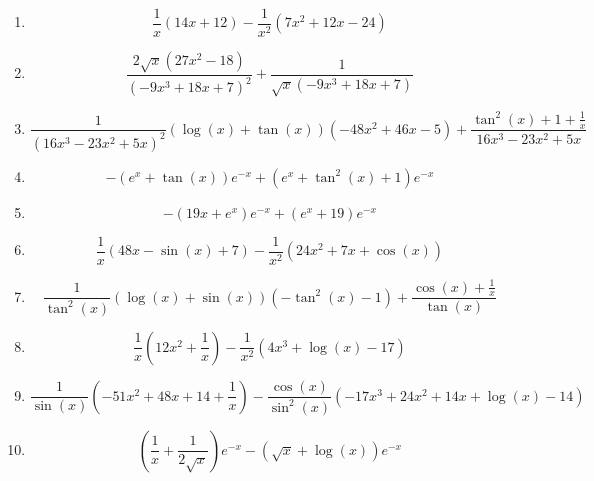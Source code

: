 \documentclass{article}
\begin{document}
        \begin{enumerate}
        \item$$\frac{1}{x} \left(14 x + 12\right) - \frac{1}{x^{2}} \left(7 x^{2} + 12 x - 24\right)$$
\item$$\frac{2 \sqrt{x} \left(27 x^{2} - 18\right)}{\left(- 9 x^{3} + 18 x + 7\right)^{2}} + \frac{1}{\sqrt{x} \left(- 9 x^{3} + 18 x + 7\right)}$$
\item$$\frac{1}{\left(16 x^{3} - 23 x^{2} + 5 x\right)^{2}} \left(\log{\left (x \right )} + \tan{\left (x \right )}\right) \left(- 48 x^{2} + 46 x - 5\right) + \frac{\tan^{2}{\left (x \right )} + 1 + \frac{1}{x}}{16 x^{3} - 23 x^{2} + 5 x}$$
\item$$- \left(e^{x} + \tan{\left (x \right )}\right) e^{- x} + \left(e^{x} + \tan^{2}{\left (x \right )} + 1\right) e^{- x}$$
\item$$- \left(19 x + e^{x}\right) e^{- x} + \left(e^{x} + 19\right) e^{- x}$$
\item$$\frac{1}{x} \left(48 x - \sin{\left (x \right )} + 7\right) - \frac{1}{x^{2}} \left(24 x^{2} + 7 x + \cos{\left (x \right )}\right)$$
\item$$\frac{1}{\tan^{2}{\left (x \right )}} \left(\log{\left (x \right )} + \sin{\left (x \right )}\right) \left(- \tan^{2}{\left (x \right )} - 1\right) + \frac{\cos{\left (x \right )} + \frac{1}{x}}{\tan{\left (x \right )}}$$
\item$$\frac{1}{x} \left(12 x^{2} + \frac{1}{x}\right) - \frac{1}{x^{2}} \left(4 x^{3} + \log{\left (x \right )} - 17\right)$$
\item$$\frac{1}{\sin{\left (x \right )}} \left(- 51 x^{2} + 48 x + 14 + \frac{1}{x}\right) - \frac{\cos{\left (x \right )}}{\sin^{2}{\left (x \right )}} \left(- 17 x^{3} + 24 x^{2} + 14 x + \log{\left (x \right )} - 14\right)$$
\item$$\left(\frac{1}{x} + \frac{1}{2 \sqrt{x}}\right) e^{- x} - \left(\sqrt{x} + \log{\left (x \right )}\right) e^{- x}$$
        \end{enumerate}
        

    
\end{document}
